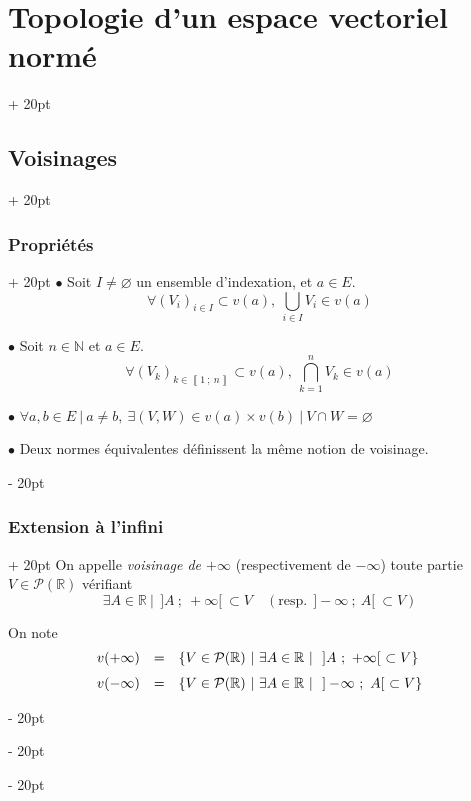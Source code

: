 \documentclass[a4paper, 12pt, twoside]{article}
\newcommand{\N}{\mathbb{N}} %
\newcommand{\R}{\mathbb{R}} %
\newcommand{\nset}[2]{\left\llbracket #1\ ;\ #2 \right\rrbracket}
\newcommand{\lr}[1]{\left( #1 \right)}
\newcommand{\set}[1]{\left\{ #1 \right\}}
\newcommand{\ind}[1][20pt]{\advance\leftskip + #1}
\newcommand{\deind}[1][20pt]{\advance\leftskip - #1}
\newenvironment{indt}[2][20pt]{#2 \par \ind[#1]}{\par \deind} %
\begin{document}
\begin{indt}{\section{Topologie d'un espace vectoriel normé}}
\begin{indt}{\subsection{Voisinages}}
\begin{indt}{\subsubsection{Propriétés}}
                $\bullet$ Soit $I \neq \varnothing$ un ensemble d'indexation, et $a \in E$.
                \[
                    \forall \lr{V_i}_{i \in I} \subset v(a),\
                    \bigcup_{i \in I} V_i \in v(a)
                \]

                $\bullet$ Soit $n \in \N$ et $a \in E$.
                \[
                    \forall \!\lr{V_k}_{k \in \nset 1 n} \subset v(a),\
                    \bigcap_{k = 1}^n V_k \in v(a)
                \]

                $\bullet$ $
                    \forall a, b \in E\ |\ a \neq b,\
                    \exists (V, W) \in v(a) \times v(b)\ |\ V \cap W = \varnothing
                $

                $\bullet$ Deux normes équivalentes définissent la même notion de voisinage.
            \end{indt}

            \vspace{12pt}
            
            \begin{indt}{\subsubsection{Extension à l'infini}}
                On appelle \emph{voisinage de $+\infty$} (respectivement de $-\infty$) toute partie $V \in \mathcal P(\R)$ vérifiant
                \[
                    \exists A \in \R\ |\ \ ]A\ ;\ +\infty[\ \subset V
                    \quad (\text{resp.}\ \ ] -\!\infty\ ;\ A[\ \subset V)
                \]

                On note
                \[
                    \begin{array}{rcl}
                        v(+\infty)
                        &=&
                        \set{V \in \mathcal P(\R)\ |\ \exists A \in \R\ |\ \ ]A\ ;\ +\infty[\ \subset V}
                        \vspace{6pt}
                        \\
                        v(-\infty)
                        &=&
                        \set{V \in \mathcal P(\R)\ |\ \exists A \in \R\ |\ \ ] -\!\infty\ ;\ A[\ \subset V}
                    \end{array}
                \]
            \end{indt}
        \end{indt}

        \vspace{12pt}
        

\end{indt}
\end{document}

